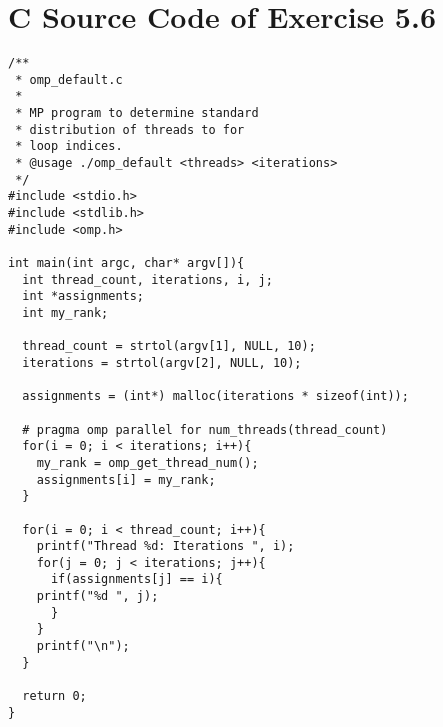\documentclass[a4paper,11pt,twoside]{article}
\begin{document}
\section{C Source Code of Exercise 5.6}{\label{app:default}}
\begin{verbatim}
/**
 * omp_default.c
 * 
 * MP program to determine standard 
 * distribution of threads to for
 * loop indices.
 * @usage ./omp_default <threads> <iterations> 
 */
#include <stdio.h>
#include <stdlib.h>
#include <omp.h>

int main(int argc, char* argv[]){
  int thread_count, iterations, i, j;
  int *assignments;
  int my_rank;

  thread_count = strtol(argv[1], NULL, 10);
  iterations = strtol(argv[2], NULL, 10);

  assignments = (int*) malloc(iterations * sizeof(int));

  # pragma omp parallel for num_threads(thread_count)
  for(i = 0; i < iterations; i++){
    my_rank = omp_get_thread_num();
    assignments[i] = my_rank;
  }

  for(i = 0; i < thread_count; i++){
    printf("Thread %d: Iterations ", i);
    for(j = 0; j < iterations; j++){
      if(assignments[j] == i){
	printf("%d ", j);
      }
    }
    printf("\n");
  }

  return 0;
}

\end{verbatim}



\end{document}
